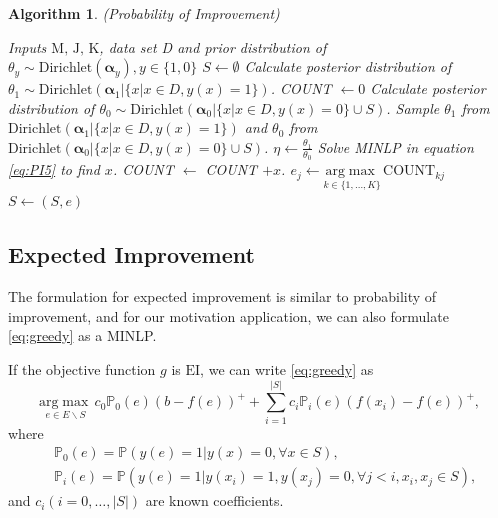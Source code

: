 \documentclass[opre,nonblindrev]{informs3} %
\newcommand{\EI}{\mathrm{EI}}
\newtheorem{Algorithm}{Algorithm}
\begin{document}
\begin{Algorithm}(Probability of Improvement) \label{algo1}
\begin{algorithmic}[1]
\REQUIRE Inputs $\text{M, J, K}$, data set D and prior distribution of $\theta_y \sim \text{Dirichlet} (\boldsymbol \alpha_y), y \in \{1,0\}$
\STATE $S \leftarrow \emptyset $
\STATE Calculate posterior distribution of $\theta_1 \sim \text{Dirichlet} (\boldsymbol \alpha_1|\{x|x \in D,y(x)=1\})$.
\STATE COUNT $\leftarrow 0$
\STATE Calculate posterior distribution of $\theta_0 \sim \text{Dirichlet} (\boldsymbol \alpha_0|\{x|x \in D,y(x)=0\} \cup S)$.
\LOOP 
\STATE Sample $\theta_1$ from $\text{Dirichlet} (\boldsymbol \alpha_1|\{x|x \in D,y(x)=1\})$ and $\theta_0$ from $\text{Dirichlet} (\boldsymbol \alpha_0|\{x|x \in D,y(x)=0\} \cup S)$.
\STATE $\eta \leftarrow \frac{\theta_1}{\theta_0}$
\STATE Solve MINLP in equation \eqref{eq:PI5} to find $x$.
\STATE COUNT $\leftarrow$ COUNT $+ x$.
\ENDLOOP
{}
\STATE $e_j \leftarrow \underset{k \in \{1,\ldots,K\}}{\mathrm{arg}\max} \, \text{COUNT}_{kj}$
\ENDFOR
\STATE $S \leftarrow (S, e)$
\ENDFOR
\end{algorithmic}
\end{Algorithm}

\subsection{Expected Improvement}
The formulation for expected improvement is similar to probability of improvement, and for our motivation application, we can also formulate \eqref{eq:greedy} as a MINLP.
\begin{proposition}
  If the objective function $g$ is $\EI$, we can write \eqref{eq:greedy} as 
  \begin{equation} \label{eq:EI1}
    \underset{e \in E \backslash S}{\mathrm{arg}\max} \, c_0 \mathbb{P}_0(e)(b-f(e))^+ + \sum_{i=1}^{|S|} c_i \mathbb{P}_i(e)(f(x_i)-f(e))^+,
  \end{equation}
  where
  \begin{equation*}
    \begin{split}
      &\mathbb{P}_0(e)=\mathbb{P}(y(e)=1|y(x)=0, \forall x \in S), \\
      &\mathbb{P}_i(e)=\mathbb{P}(y(e)=1|y(x_i)=1, y(x_j)=0, \forall j<i, x_i,x_j \in S),
    \end{split}
  \end{equation*}
  and $c_i (i=0,\ldots,|S|)$ are known coefficients.
\end{proposition}
\end{document}
